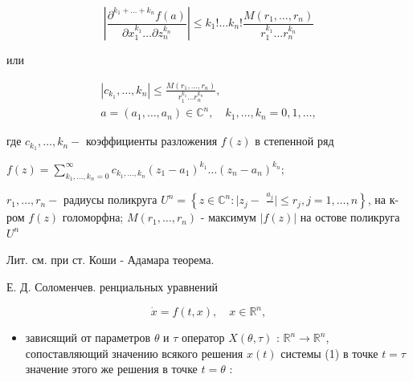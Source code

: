 \documentclass[10pt]{article}
\begin{document}
\[

\left|\frac{\partial^{k_{1}+\ldots+k_{n}} f(a)}{\partial x_{1}^{k_{1}} \ldots \partial z_{n}^{k_{n}}}\right| \leqslant k_{1} ! \ldots k_{n} ! \frac{M\left(r_{1}, \ldots, r_{n}\right)}{r_{1}^{k_{1}} \ldots r_{n}^{k_{n}}}

\]



или



\[

\begin{gathered}

\left|c_{k_{1}}, \ldots, k_{n}\right| \leqslant \frac{M\left(r_{1}, \ldots, r_{n}\right)}{r_{1}^{k_{1}} \ldots r_{n}^{k_{n}}}, \\

a=\left(a_{1}, \ldots, a_{n}\right) \in \mathbb{C}^{n}, \quad k_{1}, \ldots, k_{n}=0,1, \ldots,

\end{gathered}

\]



где $c_{k_{1}}, \ldots, k_{n}-$ коэффициенты разложения $f(z)$ в степенной ряд



$f(z)=\sum_{k_{1}, \ldots, k_{n}=0}^{\infty} c_{k_{1}, \ldots, k_{n}}\left(z_{1}-a_{1}\right)^{k_{1}} \ldots\left(z_{n}-a_{n}\right)^{k_{n}} ;$



$r_{1}, \ldots, r_{n}-$ радиусы поликруга $U^{n}=\left\{z \in \mathbb{C}^{n}: \mid z_{j}-\right.$ $\left.\frac{a_{j}}{} \mid \leqslant r_{j}, j=1, \ldots, n\right\}$, на к-ром $f(z)$ голоморфна; $M\left(r_{1}, \ldots, r_{n}\right)$ - максимум $|f(z)|$ на остове поликруга $U^{n}$



Лит. см. при ст. Коши - Адамара теорема.



Е. Д. Соломенчев. ренциальных уравнений



\[

\dot{x}=f(t, x), \quad x \in \mathbb{R}^{n},

\]



\begin{itemize}

  \item зависящий от параметров $\theta$ и $\tau$ оператор $X(\theta, \tau)$ : $\mathbb{R}^{n} \rightarrow \mathbb{R}^{n}$, сопоставляющий значению всякого решения $x(t)$ системы (1) в точке $t=\tau$ значение этого же решения в точке $t=\theta$ :

\end{itemize}
\end{document}
